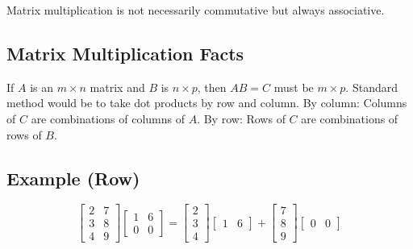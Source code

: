 Matrix multiplication is not necessarily commutative but always associative.

\subsection{Matrix Multiplication Facts}

If $A$ is an $m\times n$ matrix and $B$ is $n\times p$, then $AB=C$ must be $m\times p$.
Standard method would be to take dot products by row and column. By column: Columns of $C$ are combinations of columns
of $A$. By row: Rows of $C$ are combinations of rows of $B$.

\subsection{Example (Row)}

\[
    \left[\begin{array}{ll}
        2 & 7 \\
        3 & 8 \\
        4 & 9
        \end{array}\right]\left[\begin{array}{ll}
        1 & 6 \\
        0 & 0
        \end{array}\right]=\left[\begin{array}{l}
        2 \\
        3 \\
        4
        \end{array}\right]\left[\begin{array}{ll}
        1 & 6
        \end{array}\right]+\left[\begin{array}{l}
        7 \\
        8 \\
        9
        \end{array}\right]\left[\begin{array}{ll}
        0 & 0
    \end{array}\right]
\]
